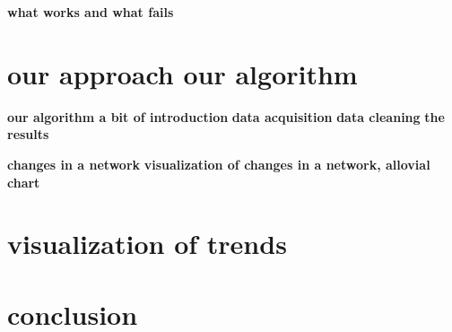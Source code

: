 \textbf{what works and what fails}\newline
\section{our approach our algorithm}
\textbf{our algorithm a bit of introduction}\newline
\textbf{data acquisition}\newline
\textbf{data cleaning}\newline
\textbf{the results}\newline



\textbf{changes in a network}
\textbf{visualization of changes in a network, allovial chart}
\section{visualization of trends}

\section{conclusion}


